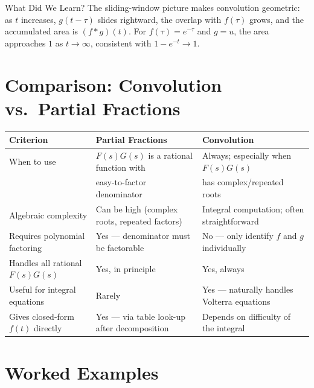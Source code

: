 \documentclass[12pt,a4paper]{article}
\begin{document}
\begin{learnbox}{What Did We Learn?}
The sliding-window picture makes convolution geometric: as $t$ increases,
$g(t-\tau)$ slides rightward, the overlap with $f(\tau)$ grows, and the
accumulated area is $(f*g)(t)$. For $f(\tau)=e^{-\tau}$ and $g=u$, the area
approaches $1$ as $t\to\infty$, consistent with $1-e^{-t}\to 1$.
\end{learnbox}

\section{Comparison: Convolution vs.\ Partial Fractions}

\begin{center}
\begin{tabular}{@{}lll@{}}
\toprule
\textbf{Criterion} & \textbf{Partial Fractions} & \textbf{Convolution} \\
\midrule
When to use &
  $F(s)G(s)$ is a rational function with &
  Always; especially when $F(s)G(s)$ \\
  & easy-to-factor denominator & has complex/repeated roots \\
Algebraic complexity &
  Can be high (complex roots, repeated factors) &
  Integral computation; often straightforward \\
Requires polynomial factoring &
  Yes --- denominator must be factorable &
  No --- only identify $f$ and $g$ individually \\
Handles all rational $F(s)G(s)$ &
  Yes, in principle &
  Yes, always \\
Useful for integral equations &
  Rarely &
  Yes --- naturally handles Volterra equations \\
Gives closed-form $f(t)$ directly &
  Yes --- via table look-up after decomposition &
  Depends on difficulty of the integral \\
\bottomrule
\end{tabular}
\end{center}

\section{Worked Examples}
\end{document}
